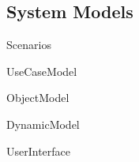\subsection{System Models}

{Scenarios}

{UseCaseModel}

{ObjectModel}

{DynamicModel}

{UserInterface}
